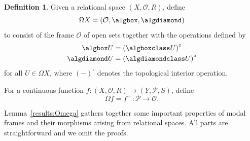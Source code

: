 \documentclass{article}[a4paper]
\theoremstyle{definition}
\newtheorem{definition}{Definition}%
\newcommand{\Ocal}{\mathcal{O}} %
\newcommand{\Pcal}{\mathcal{P}} %
\newcommand{\invim}{^{\leftarrow}} %
\newcommand{\interiorop}[1]{{#1}^\circ}
\begin{document}
\begin{definition}
\label{def:OmegaAssignments}
    Given a relational space $(X , \Ocal , R )$, define 
    \begin{equation*}
        \Omega X = (\Ocal , \algbox , \algdiamond )
    \end{equation*} 
    to consist of the frame $\Ocal$ of open sets  together with the operations defined by 
    \begin{align}
    \label{intBoxInterp}
        \algbox U 
        &= 
        \interiorop{(\algboxclass U)} 
        \\
        \algdiamond U 
        & = 
        \interiorop{(\algdiamondclass U)}  
        \label{intDiaInterp} 
    \end{align}
    for all $U \in \Omega X$, where $\interiorop{(-)}$ denotes the topological interior operation.

    For a continuous function 
    $f:(X, \Ocal , R) \longrightarrow (Y, \Pcal , S)$, define 
    \begin{equation*}
        \Omega f = f\invim : \Pcal \longrightarrow \Ocal .
    \end{equation*} 
\end{definition}

Lemma~\ref{results:Omega} gathers together some important properties of modal frames and their morphisms arising from relational spaces. All parts are straightforward and we omit the proofs.
\end{document}
